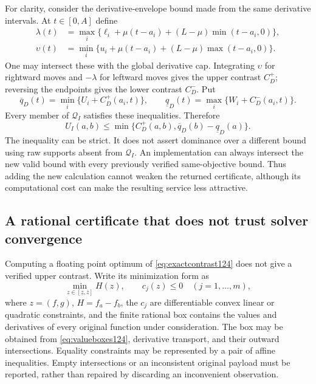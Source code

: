 For clarity, consider the derivative-envelope bound made from the same
derivative intervals. At $t\in[0,A]$ define
\begin{align*}
 \lambda(t)&=\max_i\{\ell_i+\mu(t-a_i)
                        +(L-\mu)\min(t-a_i,0)\},\\
 \upsilon(t)&=\min_i\{u_i+\mu(t-a_i)
                        +(L-\mu)\max(t-a_i,0)\}.
\end{align*}
One may intersect these with the global derivative cap. Integrating
$\upsilon$ for rightward moves and $-\lambda$ for leftward moves gives
the upper contrast $C_D^+$; reversing the endpoints gives the lower
contrast $C_D^-$. Put
\[
 \overline q_D(t)=\min_i\{U_i+C_D^+(a_i,t)\},\qquad
 \underline q_D(t)=\max_i\{W_i+C_D^-(a_i,t)\}.
\]
Every member of $\mathcal Q_I$ satisfies these inequalities. Therefore
\begin{equation}\label{eq:jointdominance124}
 U_I(a,b)\le
 \min\{C_D^+(a,b),\overline q_D(b)-\underline q_D(a)\}.
\end{equation}
The inequality can be strict. It does not assert dominance over a
different bound using raw supports absent from $\mathcal Q_I$.
An implementation can always intersect the new valid bound with every
previously verified same-objective bound. Thus adding the new calculation
cannot weaken the returned certificate, although its computational cost
can make the resulting service less attractive.

\subsection{A rational certificate that does not trust solver convergence}

Computing a floating point optimum of
\eqref{eq:exactcontrast124} does not give a verified upper contrast.
Write its minimization form as
\[
 \min_{z\in[\underline z,\overline z]}
       H(z),\qquad c_j(z)\le0\quad(j=1,\ldots,m),
\]
where $z=(f,g)$, $H=f_a-f_b$, the $c_j$ are differentiable convex
linear or quadratic constraints, and the finite rational box contains
the values and derivatives of every original function under consideration.
The box may be obtained from \eqref{eq:valueboxes124}, derivative
transport, and their outward intersections. Equality constraints may be
represented by a pair of affine inequalities. Empty intersections or an
inconsistent original payload must be reported, rather than repaired by
discarding an inconvenient observation.

